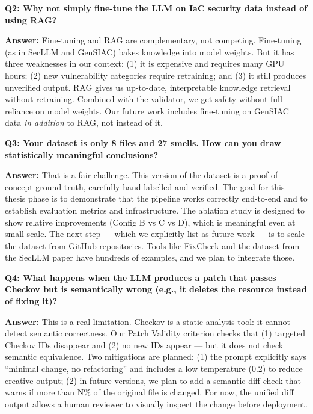 \documentclass[12pt,a4paper]{article}
\begin{document}
\begin{qabox}
\textbf{Q2: Why not simply fine-tune the LLM on IaC security data instead of using RAG?}

\textbf{Answer:} Fine-tuning and RAG are complementary, not competing. Fine-tuning (as in SecLLM and GenSIAC) bakes knowledge into model weights. But it has three weaknesses in our context: (1) it is expensive and requires many GPU hours; (2) new vulnerability categories require retraining; and (3) it still produces unverified output. RAG gives us up-to-date, interpretable knowledge retrieval without retraining. Combined with the validator, we get safety without full reliance on model weights. Our future work includes fine-tuning on GenSIAC data \textit{in addition} to RAG, not instead of it.
\end{qabox}

\begin{qabox}
\textbf{Q3: Your dataset is only 8 files and 27 smells. How can you draw statistically meaningful conclusions?}

\textbf{Answer:} That is a fair challenge. This version of the dataset is a proof-of-concept ground truth, carefully hand-labelled and verified. The goal for this thesis phase is to demonstrate that the pipeline works correctly end-to-end and to establish evaluation metrics and infrastructure. The ablation study is designed to show relative improvements (Config B vs C vs D), which is meaningful even at small scale. The next step --- which we explicitly list as future work --- is to scale the dataset from GitHub repositories. Tools like FixCheck and the dataset from the SecLLM paper have hundreds of examples, and we plan to integrate those.
\end{qabox}

\begin{qabox}
\textbf{Q4: What happens when the LLM produces a patch that passes Checkov but is semantically wrong (e.g., it deletes the resource instead of fixing it)?}

\textbf{Answer:} This is a real limitation. Checkov is a static analysis tool: it cannot detect semantic correctness. Our Patch Validity criterion checks that (1) targeted Checkov IDs disappear and (2) no new IDs appear --- but it does not check semantic equivalence. Two mitigations are planned: (1) the prompt explicitly says ``minimal change, no refactoring'' and includes a low temperature (0.2) to reduce creative output; (2) in future versions, we plan to add a semantic diff check that warns if more than N\% of the original file is changed. For now, the unified diff output allows a human reviewer to visually inspect the change before deployment.
\end{qabox}
\end{document}
